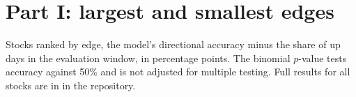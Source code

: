 \documentclass[11pt]{article}
\begin{document}



\clearpage
\appendix
\section{Part I: largest and smallest edges}

\begin{table}[h]
\centering
\caption{Stocks with the largest and smallest edge over the always-up rule}
\label{tab:extremes}
\small

\begin{tablenote}
Stocks ranked by edge, the model's directional accuracy minus the share of up days
in the evaluation window, in percentage points. The binomial $p$-value tests
accuracy against 50\% and is not adjusted for multiple testing. Full results for
all \NStocks{} stocks are in  in the repository.
\end{tablenote}
\end{table}
\end{document}

